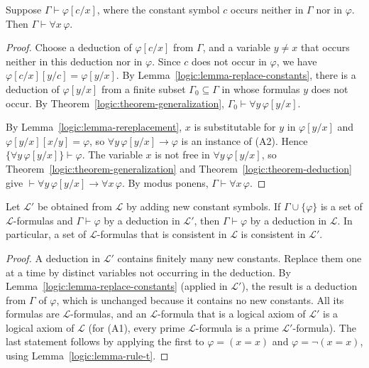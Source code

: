 \begin{corollary}\label{logic:corollary-generalization-constants}
Suppose $\Gamma \vdash \varphi[c/x]$, where the constant symbol $c$ occurs
neither in $\Gamma$ nor in $\varphi$. Then $\Gamma \vdash \forall x\,\varphi$.
\end{corollary}

\begin{proof}
Choose a deduction of $\varphi[c/x]$ from $\Gamma$, and a variable $y \neq x$
that occurs neither in this deduction nor in $\varphi$. Since $c$ does not occur
in $\varphi$, we have $\varphi[c/x][y/c] = \varphi[y/x]$. By
Lemma~\ref{logic:lemma-replace-constants}, there is a deduction of
$\varphi[y/x]$ from a finite subset $\Gamma_0 \subseteq \Gamma$ in whose
formulas $y$ does not occur. By Theorem~\ref{logic:theorem-generalization},
$\Gamma_0 \vdash \forall y\,\varphi[y/x]$.

By Lemma~\ref{logic:lemma-rereplacement}, $x$ is substitutable for $y$ in
$\varphi[y/x]$ and $\varphi[y/x][x/y] = \varphi$, so
$\forall y\,\varphi[y/x] \to \varphi$ is an instance of (A2). Hence
$\{\forall y\,\varphi[y/x]\} \vdash \varphi$. The variable $x$ is not free in
$\forall y\,\varphi[y/x]$, so Theorem~\ref{logic:theorem-generalization} and
Theorem~\ref{logic:theorem-deduction} give
$\vdash \forall y\,\varphi[y/x] \to \forall x\,\varphi$. By modus ponens,
$\Gamma \vdash \forall x\,\varphi$.
\end{proof}

\begin{lemma}\label{logic:lemma-new-constants}
Let $\mathcal{L}'$ be obtained from $\mathcal{L}$ by adding new constant
symbols. If $\Gamma \cup \{\varphi\}$ is a set of $\mathcal{L}$-formulas and
$\Gamma \vdash \varphi$ by a deduction in $\mathcal{L}'$, then
$\Gamma \vdash \varphi$ by a deduction in $\mathcal{L}$. In particular, a set of
$\mathcal{L}$-formulas that is consistent in $\mathcal{L}$ is consistent in
$\mathcal{L}'$.
\end{lemma}

\begin{proof}
A deduction in $\mathcal{L}'$ contains finitely many new constants. Replace
them one at a time by distinct variables not occurring in the deduction. By
Lemma~\ref{logic:lemma-replace-constants} (applied in $\mathcal{L}'$), the
result is a deduction from $\Gamma$ of $\varphi$, which is unchanged because
it contains no new constants. All its formulas are $\mathcal{L}$-formulas, and
an $\mathcal{L}$-formula that is a logical axiom of $\mathcal{L}'$ is a logical
axiom of $\mathcal{L}$ (for (A1), every prime $\mathcal{L}$-formula is a prime
$\mathcal{L}'$-formula). The last statement follows by applying the first to
$\varphi = (x = x)$ and $\varphi = \neg(x = x)$, using
Lemma~\ref{logic:lemma-rule-t}.
\end{proof}

